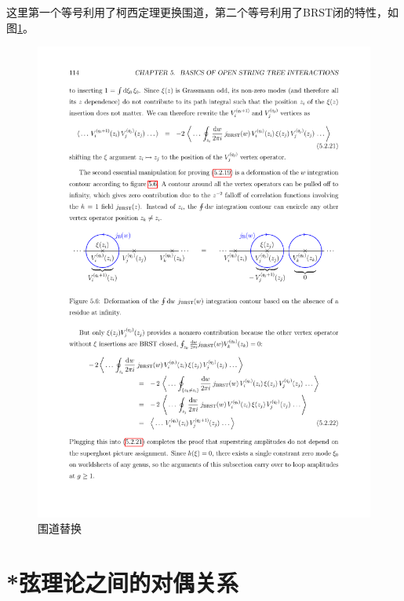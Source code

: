 这里第一个等号利用了柯西定理更换围道，第二个等号利用了BRST闭的特性，如图\ref{fig:2}。
\begin{figure}[htbp]
	\centering
	\includegraphics[width=\linewidth]{figs/fig2.pdf}
	\caption{围道替换}
	\label{fig:2}
\end{figure}
\section{*弦理论之间的对偶关系}
